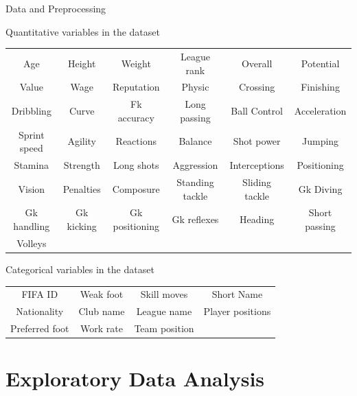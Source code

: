 \documentclass[aspectratio=169,xcolor=dvipsnames]{beamer}
\begin{document}
\begin{frame}{Data and Preprocessing}
\begin{small}
\begin{block}{Quantitative variables in the dataset}
\begin{table}[ht]
\centering
\begin{tabular}{cccccc}
    Age & Height & Weight & League rank & Overall & Potential\\ 
    Value & Wage & Reputation & Physic & Crossing & Finishing\\
    Dribbling & Curve & Fk accuracy & Long passing & Ball Control & Acceleration\\
    Sprint speed & Agility & Reactions & Balance& Shot power & Jumping\\   
    Stamina & Strength & Long shots & Aggression & Interceptions & Positioning\\
    Vision & Penalties & Composure & Standing tackle & Sliding tackle & Gk Diving\\
    Gk handling & Gk kicking& Gk positioning & Gk reflexes & Heading & Short passing\\
    Volleys
\end{tabular}
\end{table}
\end{block}
\end{small}
\begin{small}
\begin{block}{Categorical variables in the dataset}
\begin{table}[ht]
\centering
\begin{tabular}{cccc}
  FIFA ID & Weak foot & Skill moves & Short Name\\
  Nationality & Club name & League name & Player positions\\
  Preferred foot & Work rate & Team position &
\end{tabular}
\end{table}
\end{block}
\end{small}
\end{frame}


\section{Exploratory Data Analysis}

\end{document}
